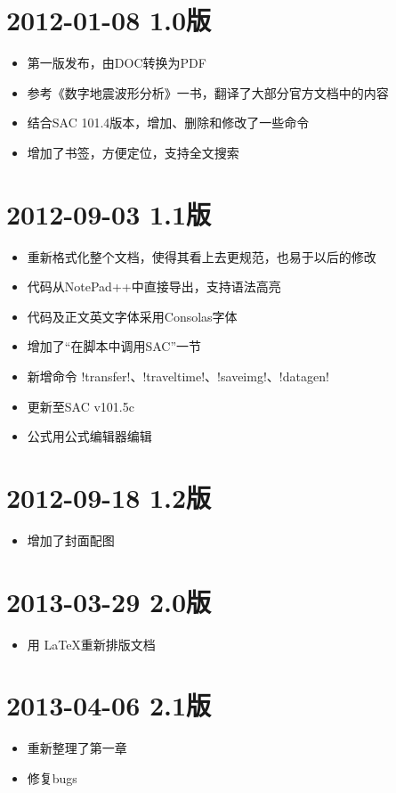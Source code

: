 \section*{2012-01-08 1.0版}
\begin{itemize}
\item 第一版发布，由DOC转换为PDF
\item 参考《数字地震波形分析》一书，翻译了大部分官方文档中的内容
\item 结合SAC 101.4版本，增加、删除和修改了一些命令
\item 增加了书签，方便定位，支持全文搜索
\end{itemize}

\section*{2012-09-03 1.1版}
\begin{itemize}
\item 重新格式化整个文档，使得其看上去更规范，也易于以后的修改
\item 代码从NotePad++中直接导出，支持语法高亮
\item 代码及正文英文字体采用Consolas字体
\item 增加了``在脚本中调用SAC''一节
\item 新增命令 !transfer!、!traveltime!、!saveimg!、!datagen!
\item 更新至SAC v101.5c
\item 公式用公式编辑器编辑
\end{itemize}

\section*{2012-09-18 1.2版}
\begin{itemize}
\item 增加了封面配图
\end{itemize}

\section*{2013-03-29 2.0版}
\begin{itemize}
\item 用 \LaTeX 重新排版文档
\end{itemize}

\section*{2013-04-06 2.1版}
\begin{itemize}
\item 重新整理了第一章
\item 修复bugs
\end{itemize}


